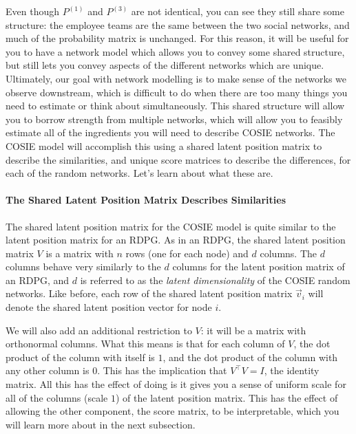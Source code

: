 Even though $P^{(1)}$ and $P^{(3)}$ are not {identical}, you can see they still share {some} structure: the employee teams are the same between the two social networks, and much of the probability matrix is unchanged. For this reason, it will be useful for you to have a network model which allows you to convey {some} shared structure, but still lets you convey aspects of the different networks which are {unique}. Ultimately, our goal with network modelling is to make sense of the networks we observe downstream, which is difficult to do when there are too many things you need to estimate or think about simultaneously. This {shared structure} will allow you to {borrow strength} from multiple networks, which will allow you to feasibly estimate all of the ingredients you will need to describe COSIE networks. The COSIE model will accomplish this using a {shared latent position matrix} to describe the {similarities}, and unique {score matrices} to describe the {differences}, for each of the random networks. Let's learn about what these are.

\paragraph{The Shared Latent Position Matrix Describes Similarities}
\label{sec:ch5:multi:cosie:slpm}

The {shared latent position matrix} for the COSIE model is quite similar to the latent position matrix for an RDPG. As in an RDPG, the shared latent position matrix $V$ is a matrix with $n$ rows (one for each node) and $d$ columns. The $d$ columns behave very similarly to the $d$ columns for the latent position matrix of an RDPG, and $d$ is referred to as the \textit{latent dimensionality} of the COSIE random networks. Like before, each row of the shared latent position matrix $\vec v_i$ will denote the shared latent position vector for node $i$.

We will also add an additional restriction to $V$: it will be a matrix with orthonormal columns. What this means is that for each column of $V$, the dot product of the column with itself is $1$, and the dot product of the column with any other column is $0$. This has the implication that $V^\top V = I$, the identity matrix. All this has the effect of doing is it gives you a sense of uniform scale for all of the columns (scale $1$) of the latent position matrix. This has the effect of allowing the other component, the {score matrix}, to be interpretable, which you will learn more about in the next subsection.  

